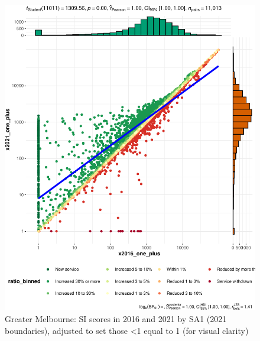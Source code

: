 \documentclass[preprint, 3p,
authoryear]{elsarticle} %
\begin{document}
\begin{figure}
\centering
\includegraphics{Leveraging_GTFS_to_assess_transit_supply_Transport_Geography_files/figure-latex/Greater_Melbourne_2016_2021_scatterplot_SA12021-1.pdf}
\caption{Greater Melbourne: SI scores in 2016 and 2021 by SA1 (2021
boundaries), adjusted to set those \textless1 equal to 1 (for visual
clarity)}
\end{figure}
\end{document}
